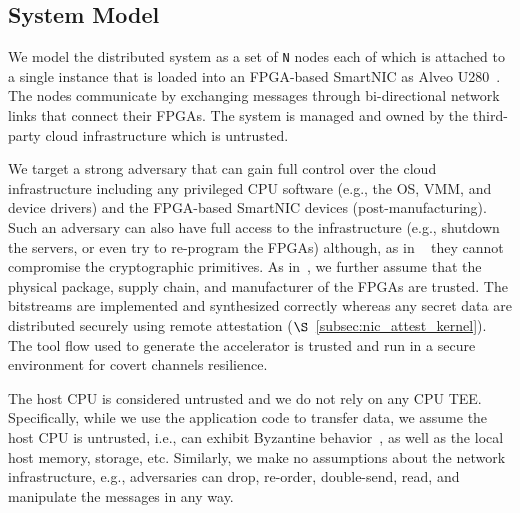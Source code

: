 

\subsection{System Model}

We model the distributed system as a set of {\tt N} nodes each of which is attached to a single \projecttitle{} instance that is loaded into an FPGA-based SmartNIC as Alveo U280~\cite{u280_smartnics}. The nodes communicate by exchanging messages through bi-directional network links that connect their FPGAs. The system is managed and owned by the third-party cloud infrastructure which is untrusted.

We target a strong adversary that can gain full control over the cloud infrastructure including any privileged CPU software (e.g., the OS, VMM, and device drivers) and the FPGA-based SmartNIC devices (post-manufacturing). Such an adversary can also have full access to the infrastructure (e.g., shutdown the servers, or even try to re-program the FPGAs) although, as in ~\cite{levin2009trinc, minBFT, Castro:2002} they cannot compromise the cryptographic primitives. As in~\cite{10.1145/3503222.3507733, 10.1145/2168836.2168866}, we further assume that the physical package, supply chain, and manufacturer of the FPGAs are trusted.  The bitstreams are implemented and synthesized correctly whereas any secret data are distributed securely using remote attestation ($\S$~\ref{subsec:nic_attest_kernel}). The tool flow used to generate the accelerator is trusted and run in a secure environment for covert channels resilience. 

The host CPU is considered untrusted and we do not rely on any CPU TEE. Specifically, while we use the application code to transfer data, we assume the host CPU is untrusted, i.e., can exhibit Byzantine behavior~\cite{Lamport:1982}, as well as the local host memory, storage, etc. Similarly, we make no assumptions about the network infrastructure, e.g., adversaries can drop, re-order, double-send, read, and manipulate the messages in any way. 

